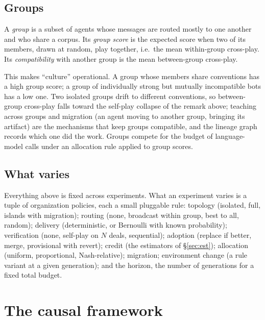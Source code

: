 \documentclass[11pt]{article}
\numberwithin{theorem}{section}
\theoremstyle{definition}
\theoremstyle{problemstyle}
\begin{document}
\subsection{Groups}

\begin{definition}\label{def:group}
A \emph{group} is a subset of agents whose messages are routed mostly to one another and who share a corpus. Its
\emph{group score} is the expected score when two of its members, drawn at random, play together, i.e.\ the mean
within-group cross-play. Its \emph{compatibility} with another group is the mean between-group cross-play.
\end{definition}

\begin{remark}
This makes ``culture'' operational. A group whose members share conventions has a high group score; a group of
individually strong but mutually incompatible bots has a low one. Two isolated groups drift to different conventions,
so between-group cross-play falls toward the self-play collapse of the remark above; teaching across groups and
migration (an agent moving to another group, bringing its artifact) are the mechanisms that keep groups compatible,
and the lineage graph records which one did the work. Groups compete for the budget of language-model calls under an
allocation rule applied to group scores.
\end{remark}

\subsection{What varies}

Everything above is fixed across experiments. What an experiment varies is a tuple of organization policies, each a
small pluggable rule: topology (isolated, full, islands with migration); routing (none, broadcast within group, best to
all, random); delivery (deterministic, or Bernoulli with known probability); verification (none, self-play on $N$
deals, sequential); adoption (replace if better, merge, provisional with revert); credit (the estimators of
\S\ref{sec:est}); allocation (uniform, proportional, Nash-relative); migration; environment change (a rule variant at a
given generation); and the horizon, the number of generations for a fixed total budget.

\section{The causal framework}\label{sec:causal}
\end{document}
